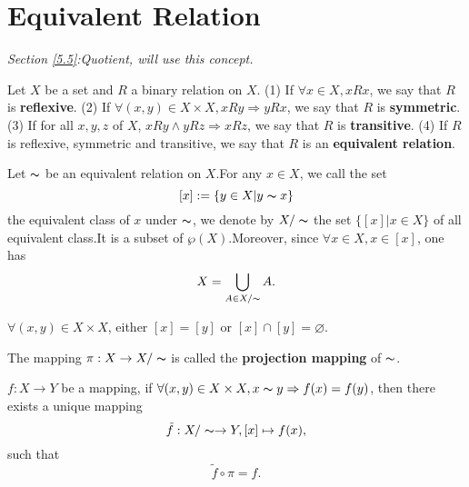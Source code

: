 \documentclass{book}
\numberwithin{equation}{section}
\begin{document}
\section{Equivalent Relation}\label{4.2}
\textit{Section \ref{5.5}:Quotient,  will use this concept.}
\begin{definitionenv}
    Let $X$ be a set and $R$ a binary relation on $X$.
    \newline
    (1) If $\forall x \in X , xRx$,  we say that $R$ is \textbf{reflexive}.
    \newline
    (2) If $\forall (x, y) \in X\times X, xRy\Rightarrow yRx$, we say that $R$ is \textbf{symmetric}.
    \newline
    (3) If for all $x, y, z$ of $X$,  $xRy\wedge yRz\Rightarrow xRz$, we say that $R$ is \textbf{transitive}.
    \newline
    (4) If $R$ is reflexive, symmetric and transitive,  we say that $R$ is an \textbf{equivalent relation}.

\end{definitionenv}
\begin{definitionenv}
    Let $\thicksim$ be an equivalent relation on $X$.For any $x\in X$,  we call the set $$[x]:=\{y\in X|y\thicksim x\}$$ the equivalent class of $x$ under $\thicksim$, we denote by $X/\thicksim$ the set $\{[x]|x\in X\}$ of all equivalent class.It is a subset of $\wp (X)$.Moreover,  since $\forall x\in X, x\in [x] $,  one has $$X=\bigcup_{A\in X/\thicksim}A.$$
\end{definitionenv}
\begin{propositionenv}
    $\forall (x, y)\in X\times X$,  either $[x]=[y]$ or $[x]\cap [y]=\varnothing$.
\end{propositionenv}
\begin{definitionenv}
    The mapping $\pi :X\rightarrow X/\thicksim$ is called the \textbf{projection mapping} of $\thicksim$.
\end{definitionenv}
\begin{propositionenv}\label{4.2.5}
    $f:X\rightarrow Y$ be a mapping, if $\forall (x, y)\in X\times X, x\thicksim y\Rightarrow f(x)=f(y)$, then there exists a unique mapping$$\tilde{f}:X/\thicksim\rightarrow Y,  [x]\mapsto f(x), $$ such that $$\tilde{f}\circ \pi =f.$$


\begin{center}
\end{center}
\end{propositionenv}
\end{document}
